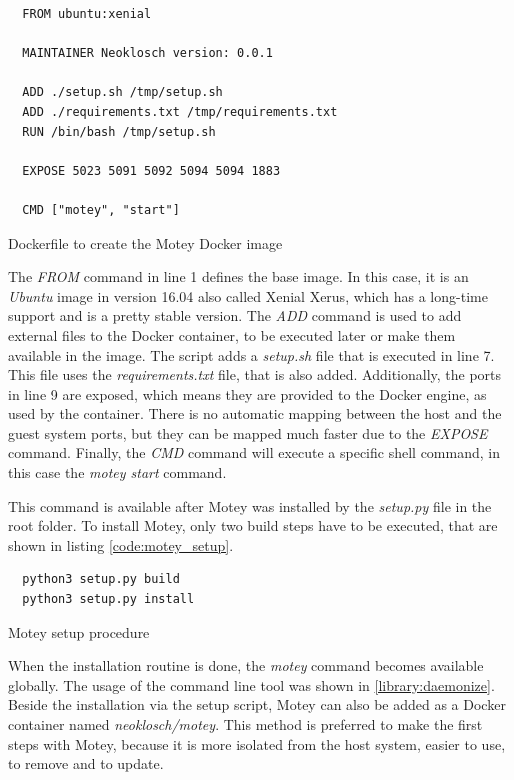 \begin{listing}[H]
  \begin{verbatim}
  FROM ubuntu:xenial

  MAINTAINER Neoklosch version: 0.0.1

  ADD ./setup.sh /tmp/setup.sh
  ADD ./requirements.txt /tmp/requirements.txt
  RUN /bin/bash /tmp/setup.sh

  EXPOSE 5023 5091 5092 5094 5094 1883

  CMD ["motey", "start"]
  \end{verbatim}
  \caption{Dockerfile to create the Motey Docker image}
  \label{code:motey_dockerfile}
\end{listing}

The \textit{FROM} command in line 1 defines the base image.
In this case, it is an \textit{Ubuntu} image in version 16.04 also called Xenial Xerus, which has a long-time support and is a pretty stable version.
The \textit{ADD} command is used to add external files to the Docker container, to be executed later or make them available in the image.
The script adds a \textit{setup.sh} file that is executed in line 7.
This file uses the \textit{requirements.txt} file, that is also added.
Additionally, the ports in line 9 are exposed, which means they are provided to the Docker engine, as used by the container.
There is no automatic mapping between the host and the guest system ports, but they can be mapped much faster due to the \textit{EXPOSE} command.
Finally, the \textit{CMD} command will execute a specific shell command, in this case the \textit{motey start} command.\newline

This command is available after Motey was installed by the \textit{setup.py} file in the root folder.
To install Motey, only two build steps have to be executed, that are shown in listing \ref{code:motey_setup}.\newline

\begin{listing}[H]
  \begin{verbatim}
  python3 setup.py build
  python3 setup.py install
  \end{verbatim}
  \caption{Motey setup procedure}
  \label{code:motey_setup}
\end{listing}

When the installation routine is done, the \textit{motey} command becomes available globally.
The usage of the command line tool was shown in \ref{library:daemonize}.
Beside the installation via the setup script, Motey can also be added as a Docker container named \textit{neoklosch/motey}.
This method is preferred to make the first steps with Motey, because it is more isolated from the host system, easier to use, to remove and to update.

